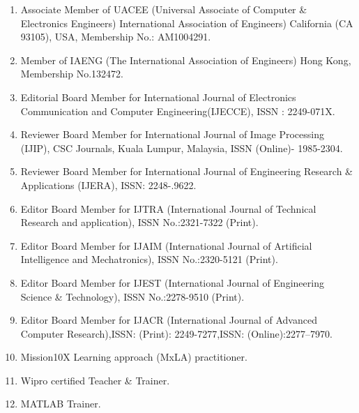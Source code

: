 %
%
%

\begin{enumerate}
	
	
	\item Associate Member of UACEE (Universal Associate of Computer \& Electronics Engineers) International Association of Engineers) California (CA 93105), USA, Membership No.: AM1004291.
	
	\item Member of IAENG (The International Association of Engineers) Hong Kong, Membership No.132472.
	
	\item Editorial Board Member for International Journal of Electronics Communication and Computer Engineering(IJECCE), ISSN : 2249-071X.
	
	\item Reviewer Board Member for International Journal of Image Processing (IJIP), CSC Journals, Kuala Lumpur, Malaysia, ISSN (Online)- 1985-2304.
	
	\item Reviewer Board Member for International Journal of Engineering Research \& Applications (IJERA), ISSN: 2248-.9622.
	
	\item Editor Board Member for IJTRA (International Journal of Technical Research and application), ISSN No.:2321-7322 (Print).
	
	\item Editor Board Member for IJAIM (International Journal of Artificial Intelligence and Mechatronics), ISSN No.:2320-5121 (Print).
	
	\item Editor Board Member for IJEST (International Journal of Engineering Science \& Technology), ISSN No.:2278-9510 (Print).
	
	\item Editor Board Member for IJACR (International Journal of Advanced Computer Research),ISSN: (Print): 2249-7277,ISSN: (Online):2277–7970.
	
	\item Mission10X Learning approach (MxLA) practitioner.
	
	\item Wipro certified Teacher \& Trainer.
	\item MATLAB Trainer.
	
\end{enumerate}